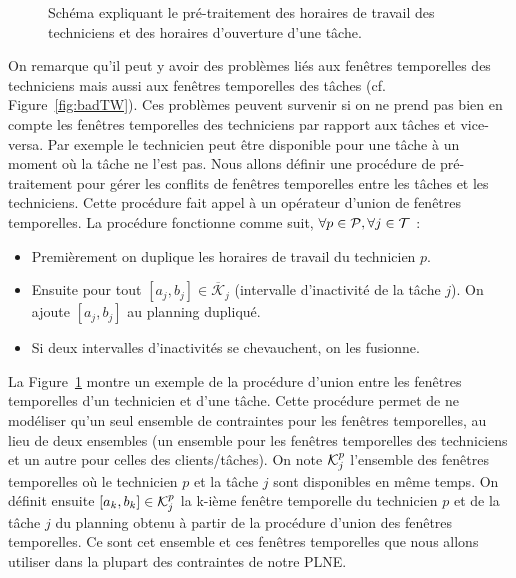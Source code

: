 \begin{figure}[H]
\caption{Schéma expliquant le pré-traitement des horaires de travail des techniciens et des horaires d'ouverture d'une tâche. \label{fig:UTW}}
\end{figure}
On remarque qu'il peut y avoir des problèmes liés aux fenêtres temporelles des techniciens mais aussi aux fenêtres temporelles des tâches (cf. Figure~\ref{fig:badTW}).
Ces problèmes peuvent survenir si on ne prend pas bien en compte les fenêtres temporelles des techniciens par rapport aux tâches et vice-versa. 
Par exemple le technicien peut être disponible pour une tâche à un moment où la tâche ne l'est pas. 
Nous allons définir une procédure de pré-traitement pour gérer les conflits de fenêtres temporelles entre les tâches et les techniciens. Cette procédure fait appel à un opérateur d'union de fenêtres temporelles. 
La procédure fonctionne comme suit, $\forall p \in \mathcal{P}, \forall j \in  \mathcal{T} $ : 
\begin{itemize}
\item Premièrement on duplique les horaires de travail du technicien $p$.
\item Ensuite pour tout $[a_j,b_j] \in \overline{\mathcal{K}}_{j}$ (intervalle d'inactivité de la tâche $j$). On ajoute $[a_j,b_j]$ au planning dupliqué.
\item Si deux intervalles d'inactivités se chevauchent, on les fusionne. 
\end{itemize}
La Figure~\ref{fig:UTW} montre un exemple de la procédure d'union entre les fenêtres temporelles d'un technicien et d'une tâche. 
Cette procédure permet de ne modéliser qu'un seul ensemble de contraintes pour les fenêtres temporelles, au lieu de deux ensembles (un ensemble pour les fenêtres temporelles des techniciens et un autre pour celles des clients/tâches).
On note $\mathcal{K}_{j}^{p}$ l'ensemble des fenêtres temporelles où le technicien $p$ et la tâche $j$ sont disponibles en même temps. On définit ensuite $[a_k,b_k]\in \mathcal{K}_{j}^{p}$ la k-ième fenêtre temporelle du technicien $p$ et de la tâche $j$ du planning obtenu à partir de la procédure d'union des fenêtres temporelles.
Ce sont cet ensemble et ces fenêtres temporelles que nous allons utiliser dans la plupart des contraintes de notre PLNE.

